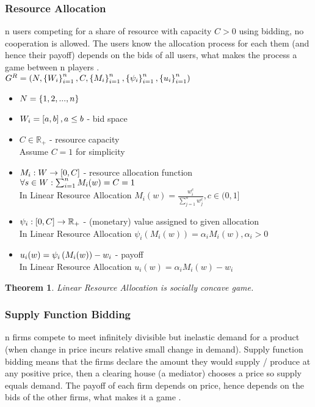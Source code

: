 \documentclass[11pt]{article}
\newtheorem{theorem}{Theorem}[section]
\theoremstyle{definition}
\theoremstyle{definition}
\begin{document}
\def\ai{\alpha_i}

\subsubsection{Resource Allocation}
n users competing for a share of resource with capacity $C > 0$ using bidding, no cooperation is allowed. The users know the allocation process for each them (and hence their payoff) depends on the bids of all users, what makes the process a game between n players \cite{allo}.\\

$G^R = \left( N, \left\{ W_i \right\}_{i=1}^{n}, C, \left\{ M_i \right\}_{i=1}^{n}, \left\{ \psi_i \right\}_{i=1}^{n}, \left\{ u_i \right\}_{i=1}^{n} \right)$
\begin{itemize}
	\item
		$N = \left\{ 1,2,...,n \right\}$
	\item
		$W_i = \left[ a,b \right], a \leq b$ - bid space
	\item
		$C \in \mathbb{R}_+$ - resource capacity\\
		Assume $C=1$ for simplicity
	\item
		$M_i: W \rightarrow \left[ 0,C \right]$ - resource allocation function\\
		$\forall s \in W: \sum_{i=1}^n M_i(w) = C = 1$\\
		In Linear Resource Allocation $M_i(w) = \frac{w_i^c}{\sum_{j=1}^n w_j^c}, c \in (0,1]$
	\item
		$\psi_i: \left[ 0,C \right] \rightarrow \mathbb{R}_+$ - (monetary) value assigned to given allocation\\
		In Linear Resource Allocation $\psi_i(M_i(w)) = \ai M_i(w), \ai > 0$
	\item
		$u_i(w) = \psi_i \left( M_i (w) \right) - w_i$ - payoff\\
		In Linear Resource Allocation $u_i(w) = \ai M_i(w) - w_i$
\end{itemize}

\begin{theorem}\label{reso}
	Linear Resource Allocation is socially concave game.
\end{theorem}

\def\ci{c_i \pr{S_i(w)}}

\subsubsection{Supply Function Bidding}
n firms compete to meet infinitely divisible but inelastic demand for a product (when change in price incurs relative small change in demand). Supply function bidding means that the firms declare the amount they would supply / produce at any positive price, then a clearing house (a mediator) chooses a price so supply equals demand. The payoff of each firm depends on price, hence depends on the bids of the other firms, what makes it a game \cite{supp}.\\
\end{document}
